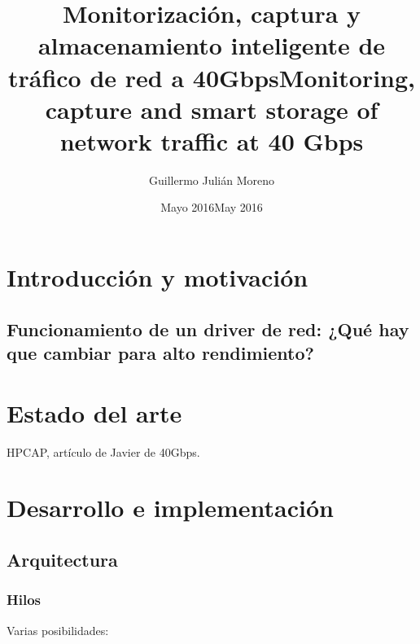 \documentclass[oneside, draft]{epstfg}
\title[spa]{Monitorización, captura y almacenamiento inteligente de tráfico de red a 40Gbps}
\title[eng]{Monitoring, capture and smart storage of network traffic at 40 Gbps}
\author{Guillermo Julián Moreno}
\date[spa]{Mayo 2016}
\date[eng]{May 2016}
\begin{document}

\frontmatter

\maketitle[spa]
\maketitle[eng]

\makeinnertitle[spa]
\makeinnertitle[eng]

\makeabstract[spa]
\makeabstract[eng]

\tableofcontents
\clearsidepage
\listoftables
\clearsidepage
\listoffigures
\clearsidepage

\mainmatter

\chapter{Introducción y motivación}

\section{Funcionamiento de un driver de red: ¿Qué hay que cambiar para alto rendimiento?}

\chapter{Estado del arte}

HPCAP, artículo de Javier de 40Gbps.

\chapter{Desarrollo e implementación}

\section{Arquitectura}

\subsection{Hilos}

Varias posibilidades:
\end{document}
